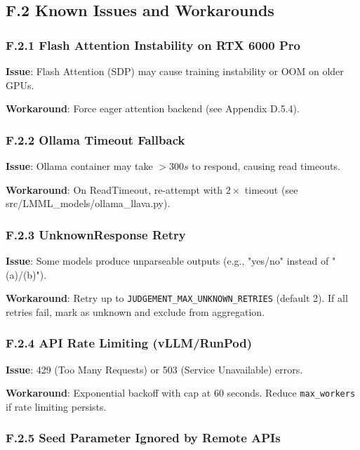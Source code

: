 \subsection*{F.2 Known Issues and Workarounds}

\subsubsection*{F.2.1 Flash Attention Instability on RTX 6000 Pro}

\textbf{Issue}: Flash Attention (SDP) may cause training instability or OOM on older GPUs.

\textbf{Workaround}: Force eager attention backend (see Appendix D.5.4).

\subsubsection*{F.2.2 Ollama Timeout Fallback}

\textbf{Issue}: Ollama container may take $> 300s$ to respond, causing read timeouts.

\textbf{Workaround}: On ReadTimeout, re-attempt with $2 \times$ timeout (see src/LMML\_models/ollama\_llava.py).

\subsubsection*{F.2.3 UnknownResponse Retry}

\textbf{Issue}: Some models produce unparseable outputs (e.g., "yes/no" instead of "(a)/(b)").

\textbf{Workaround}: Retry up to \texttt{JUDGEMENT\_MAX\_UNKNOWN\_RETRIES} (default 2). If all retries fail, mark as unknown and exclude from aggregation.

\subsubsection*{F.2.4 API Rate Limiting (vLLM/RunPod)}

\textbf{Issue}: 429 (Too Many Requests) or 503 (Service Unavailable) errors.

\textbf{Workaround}: Exponential backoff with cap at 60 seconds. Reduce \texttt{max\_workers} if rate limiting persists.

\subsubsection*{F.2.5 Seed Parameter Ignored by Remote APIs}

